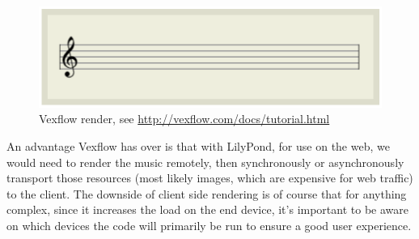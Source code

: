 \begin{figure}[h!]
  \includegraphics[width=\linewidth]{gfx/vexflow.png}
  \centering
  \caption{Vexflow render, see \url{http://vexflow.com/docs/tutorial.html}}
  \label{fig:vexflow-output}
\end{figure}

An advantage Vexflow has over  is that with LilyPond, for use on the web, we would need to render the music remotely, then synchronously or asynchronously transport those resources (most likely images, which are expensive for web traffic) to the client. The downside of client side rendering is of course that for anything complex, since it increases the load on the end device, it's important to be aware on which devices the code will primarily be run to ensure a good user experience.


